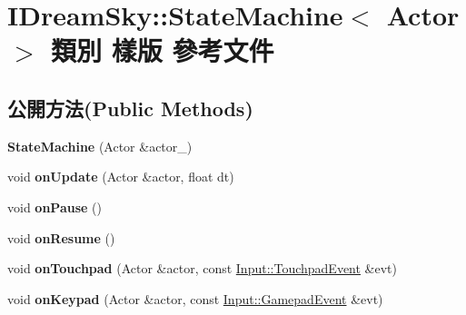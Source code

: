 \hypertarget{class_i_dream_sky_1_1_state_machine}{}\section{I\+Dream\+Sky\+:\+:State\+Machine$<$ Actor $>$ 類別 樣版 參考文件}
\label{class_i_dream_sky_1_1_state_machine}
\subsection*{公開方法(Public Methods)}
\begin{DoxyCompactItemize}
\item 
{\bfseries State\+Machine} (Actor \&actor\+\_\+)\hypertarget{class_i_dream_sky_1_1_state_machine_ab14492c1dfaa3aaaed63f3d0e71e6461}{}\label{class_i_dream_sky_1_1_state_machine_ab14492c1dfaa3aaaed63f3d0e71e6461}

\item 
void {\bfseries on\+Update} (Actor \&actor, float dt)\hypertarget{class_i_dream_sky_1_1_state_machine_ad4101769f714dbba99e50e7a4a011780}{}\label{class_i_dream_sky_1_1_state_machine_ad4101769f714dbba99e50e7a4a011780}

\item 
void {\bfseries on\+Pause} ()\hypertarget{class_i_dream_sky_1_1_state_machine_a7151524da1852a45dd32bb4ca6fb768a}{}\label{class_i_dream_sky_1_1_state_machine_a7151524da1852a45dd32bb4ca6fb768a}

\item 
void {\bfseries on\+Resume} ()\hypertarget{class_i_dream_sky_1_1_state_machine_adde8d38bdd8dd4363a16d424d50146ae}{}\label{class_i_dream_sky_1_1_state_machine_adde8d38bdd8dd4363a16d424d50146ae}

\item 
void {\bfseries on\+Touchpad} (Actor \&actor, const \hyperlink{class_i_dream_sky_1_1_input_1_1_touchpad_event}{Input\+::\+Touchpad\+Event} \&evt)\hypertarget{class_i_dream_sky_1_1_state_machine_a838d84feebecdb87c59ab1873f357e22}{}\label{class_i_dream_sky_1_1_state_machine_a838d84feebecdb87c59ab1873f357e22}

\item 
void {\bfseries on\+Keypad} (Actor \&actor, const \hyperlink{class_i_dream_sky_1_1_input_1_1_gamepad_event}{Input\+::\+Gamepad\+Event} \&evt)\hypertarget{class_i_dream_sky_1_1_state_machine_a275d8d47019b57ef3eb1527b4c652db3}{}\label{class_i_dream_sky_1_1_state_machine_a275d8d47019b57ef3eb1527b4c652db3}


\end{DoxyCompactItemize}
